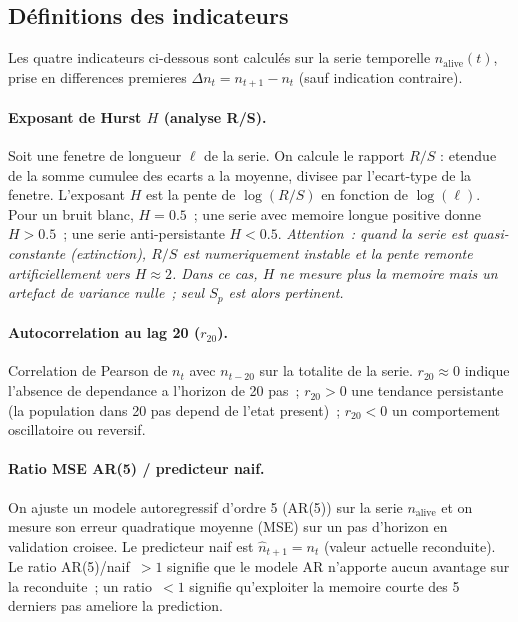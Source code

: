 \documentclass[11pt,a4paper]{article}
\begin{document}
\subsection*{Définitions des indicateurs}

Les quatre indicateurs ci-dessous sont calculés sur la serie temporelle
$n_{\mathrm{alive}}(t)$, prise en differences premieres $\Delta n_t = n_{t+1} - n_t$
(sauf indication contraire).

\paragraph{Exposant de Hurst $H$ (analyse R/S).}
Soit une fenetre de longueur $\ell$ de la serie. On calcule le rapport
$R/S$ : etendue de la somme cumulee des ecarts a la moyenne, divisee par
l'ecart-type de la fenetre. L'exposant $H$ est la pente de $\log(R/S)$
en fonction de $\log(\ell)$. Pour un bruit blanc, $H = 0.5$~; une serie
avec memoire longue positive donne $H > 0.5$~; une serie anti-persistante
$H < 0.5$. \emph{Attention~: quand la serie est quasi-constante (extinction),
$R/S$ est numeriquement instable et la pente remonte artificiellement vers
$H \approx 2$. Dans ce cas, $H$ ne mesure plus la memoire mais un artefact
de variance nulle~; seul $S_p$ est alors pertinent.}

\paragraph{Autocorrelation au lag 20 ($r_{20}$).}
Correlation de Pearson de $n_t$ avec $n_{t-20}$ sur la totalite de la serie.
$r_{20} \approx 0$ indique l'absence de dependance a l'horizon de 20 pas~;
$r_{20} > 0$ une tendance persistante (la population dans 20 pas depend de
l'etat present)~; $r_{20} < 0$ un comportement oscillatoire ou reversif.

\paragraph{Ratio MSE AR(5) / predicteur naif.}
On ajuste un modele autoregressif d'ordre 5 (AR(5)) sur la serie
$n_{\mathrm{alive}}$ et on mesure son erreur quadratique moyenne (MSE) sur
un pas d'horizon en validation croisee. Le predicteur naif est $\hat{n}_{t+1}
= n_t$ (valeur actuelle reconduite). Le ratio AR(5)/naif~$> 1$ signifie que
le modele AR n'apporte aucun avantage sur la reconduite~; un ratio~$< 1$
signifie qu'exploiter la memoire courte des 5 derniers pas ameliore la
prediction.
\end{document}
